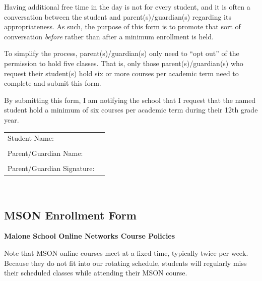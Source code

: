Having additional free time in the day is not for every student, and it is often a conversation between the student and parent(s)/guardian(s) regarding its appropriateness.  As such, the purpose of this form is to promote that sort of conversation \emph{before} rather than after a minimum enrollment is held.

To simplify the process, parent(s)/guardian(s) only need to ``opt out'' of the permission to hold five classes.  That is, only those parent(s)/guardian(s) who request their student(s)  hold six or more courses per academic term need to complete and submit this form.



\vspace{1cm}

\noindent \hrulefill

\vspace{1cm}

\noindent By submitting this form, I am notifying the school that I request that the named student hold a minimum of six courses per academic term during their 12th grade year.

\vspace{1cm}

\renewcommand{\arraystretch}{1}
\noindent\begin{tabular}{ll}
Student Name:  & \underline{\hspace{7cm}}\\
&\\
Parent/Guardian Name: & \underline{\hspace{7cm}}\\
&\\
Parent/Guardian Signature: & \underline{\hspace{7cm}}\\
\end{tabular}\\

\vspace{.5cm}

\newpage

\subsection{MSON Enrollment Form}

\noindent \textbf{Malone School Online Networks Course Policies}


Note that MSON online courses meet at a fixed time, typically twice per week.  Because they do not fit into our rotating schedule, students will regularly miss their scheduled classes while attending their MSON course. 

